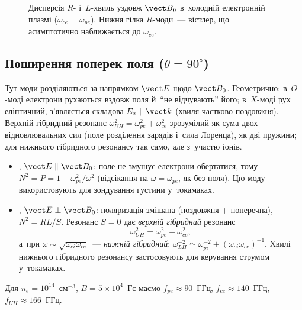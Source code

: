 \begin{figure}[ht]
\centering
{}
\caption{Дисперсія $R$- і~$L$-хвиль уздовж $\vect B_0$ в~холодній електронній плазмі
($\omega_{ce}=\omega_{pe}$). Нижня гілка $R$-моди~--- вістлер, що асимптотично
наближається до $\omega_{ce}$.}
\label{fig:rl-dispersion}
\end{figure}

\subsection*{Поширення поперек поля ($\theta=90^\circ$)}
Тут моди розділяються за напрямком $\vect E$ щодо $\vect B_0$. Геометрично: в~$O$-моді електрони рухаються вздовж поля й~\enquote{не відчувають} його;
в~$X$-моді рух еліптичний, з'являється складова $E_x\parallel\vect k$ (хвиля частково поздовжня). Верхній гібридний резонанс $\omega_{UH}^2=\omega_{pe}^2+\omega_{ce}^2$
зрозумілий як сума двох відновлювальних сил (поле розділення зарядів і~сила Лоренца), як дві пружини; для нижнього гібридного резонансу так само, але з~участю іонів.
\begin{itemize}
	\item {}, $\vect E\parallel\vect B_0$: поле не змушує електрони обертатися,
	  тому $N^2=P=1-\omega_{pe}^2/\omega^2$ (відсікання на $\omega=\omega_{pe}$, як без поля).
	  Цю моду використовують для зондування густини у~токамаках.
	\item {}, $\vect E\perp\vect B_0$: поляризація змішана (поздовжня +
	  поперечна), $N^2=RL/S$. Резонанс $S=0$ дає \emph{верхній гібридний} резонанс
	  \begin{equation}\label{eq:upper-hybrid}
	  	\omega_{UH}^2=\omega_{pe}^2+\omega_{ce}^2,
	  \end{equation}
	  а~при $\omega\sim\sqrt{\omega_{ci}\omega_{ce}}$~--- \emph{нижній гібридний}:
	  $\omega_{LH}^{-2}\simeq\omega_{pi}^{-2}+(\omega_{ci}\omega_{ce})^{-1}$. Хвилі нижнього
	  гібридного резонансу застосовують для керування струмом у~токамаках.
\end{itemize}
\begin{Estimate}
Для $n_e=10^{14}$~см$^{-3}$, $B=5\times10^4$~Гс маємо $f_{pe}\approx90$~ГГц,
$f_{ce}\approx140$~ГГц, $f_{UH}\approx166$~ГГц.
\end{Estimate}

